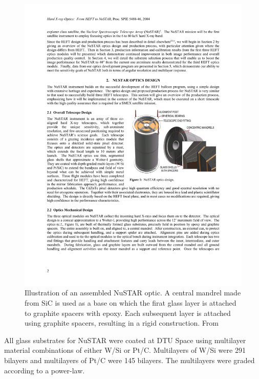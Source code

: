 \begin{figure}[!ht] %
	\centering	\includegraphics[width=0.6\linewidth]{figures/introduction/nustar_optic.pdf}
	\caption{\footnotesize Illustration of an assembled NuSTAR optic. A central mandrel made from SiC is used as a base on which the firat glass layer is attached to graphite spacers with epoxy. Each subsequent layer is attached using graphite spacers, resulting in a rigid construction. From \cite{Koglin:2004tr}}
	\label{fig:nustar_optic}
\end{figure}

All glass substrates for NuSTAR were coated at DTU Space using multilayer material combinations of either W/Si or Pt/C. Multilayers of W/Si were 291 bilayers and multilayers of Pt/C were 145 bilayers. The multilayers were graded according to a power-law\cite{Christensen:1992uc}.

